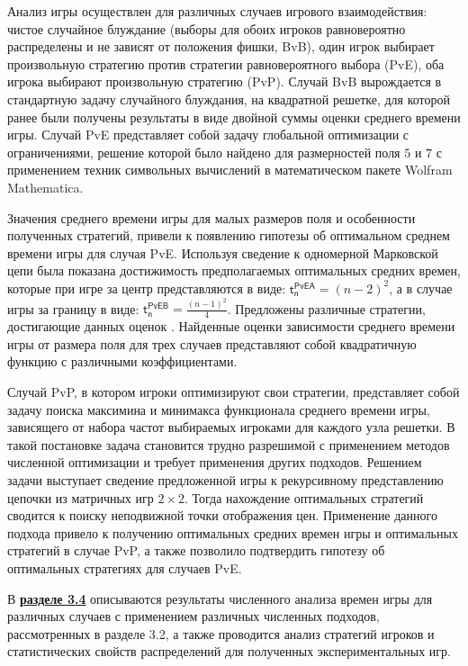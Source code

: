 Анализ игры осуществлен для различных случаев игрового взаимодействия: чистое случайное блуждание (выборы для обоих игроков равновероятно распределены и не зависят от положения фишки, BvB), один игрок выбирает произвольную стратегию против стратегии равновероятного выбора (PvE), оба игрока выбирают произвольную стратегию (PvP). Случай BvB вырождается в стандартную задачу случайного блуждания, на квадратной решетке, для которой ранее были получены результаты в виде двойной суммы оценки среднего времени игры. Случай PvE представляет собой задачу глобальной оптимизации с ограничениями, решение которой было найдено для размерностей поля $5$ и $7$ с применением техник символьных вычислений в математическом пакете Wolfram Mathematica. 

Значения среднего времени игры для малых размеров поля и особенности полученных стратегий, привели к появлению гипотезы об оптимальном среднем времени игры для случая PvE. Используя сведение к одномерной Марковской цепи была показана достижимость предполагаемых оптимальных средних времен, которые при игре за центр представляются в виде: $\boldsymbol{\mathsf{t_n^{PvE A}}} = (n-2)^2$, а в случае игры за границу в виде: $\boldsymbol{\mathsf{t_n^{PvE B}}} = \frac{(n-1)^2}{4}$. Предложены различные стратегии, достигающие данных оценок \cite{confbib1}. Найденные оценки зависимости среднего времени игры от размера поля для трех случаев представляют собой квадратичную функцию с различными коэффициентами.

Случай PvP, в котором игроки оптимизируют свои стратегии, представляет собой задачу поиска максимина и минимакса функционала среднего времени игры, зависящего от набора частот выбираемых игроками для каждого узла решетки. В такой постановке задача становится трудно разрешимой с применением методов численной оптимизации и требует применения других подходов. Решением задачи выступает сведение предложенной игры к рекурсивному представлению цепочки из матричных игр $2 \times 2$. Тогда нахождение оптимальных стратегий сводится к поиску неподвижной точки отображения цен. Применение данного подхода привело к получению оптимальных средних времен игры и оптимальных стратегий в случае PvP, а также позволило подтвердить гипотезу об оптимальных стратегиях для случаев PvE.

В \underline{\textbf{разделе 3.4}} описываются результаты численного анализа времен игры для различных случаев с применением различных численных подходов, рассмотренных в разделе 3.2, а также проводится анализ стратегий игроков и статистических свойств распределений для полученных экспериментальных игр. 

